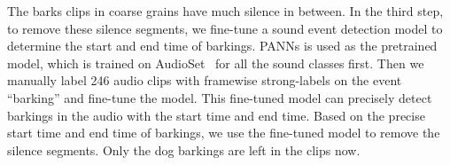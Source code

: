 The barks clips in coarse grains have much silence in between. In the third step, to remove these silence segments, we fine-tune a sound event detection model to determine the start and end time of barkings. PANNs is used as the pretrained model, which is trained on AudioSet~\cite{gemmeke2017audio} for all the sound classes first. Then we manually label 246 audio clips with framewise strong-labels on the event ``barking'' and fine-tune the model.  This fine-tuned model can precisely detect barkings in the audio with the start time and end time. Based on the precise start time and end time of barkings, we use the fine-tuned model to remove the silence segments. Only the dog barkings are left in the clips now.






